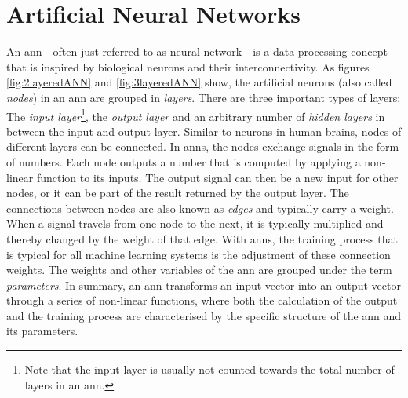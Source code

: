 \documentclass[
			   fontsize=11pt,
               paper=a4,
               bibliography=totoc,
               idxtotoc,
               headsepline,
               footsepline,
               footinclude=false,
               BCOR=12mm,
               DIV=13,
               openany,   %
               ]
               {scrbook}
\begin{document}
\section{Artificial Neural Networks} \label{ssection:ann}

An \acrlong{ann} - often just referred to as neural network - is a data processing concept that is inspired by biological neurons and their interconnectivity. As figures \autoref{fig:2layeredANN} and \autoref{fig:3layeredANN} show, the artificial neurons (also called \textit{nodes}) in an \gls{ann} are grouped in \textit{layers}. There are three important types of layers: The \textit{input layer}\footnote{Note that the input layer is usually not counted towards the total number of layers in an \gls{ann}.}, the \textit{output layer} and an arbitrary number of \textit{hidden layers} in between the input and output layer. Similar to neurons in human brains, nodes of different layers can be connected. In \glspl{ann}, the nodes exchange signals in the form of numbers. Each node outputs a number that is computed by applying a non-linear function to its inputs. The output signal can then be a new input for other nodes, or it can be part of the result returned by the output layer. The connections between nodes are also known as \textit{edges} and typically carry a weight. When a signal travels from one node to the next, it is typically multiplied and thereby changed by the weight of that edge. With \glspl{ann}, the training process that is typical for all machine learning systems is the adjustment of these connection weights. The weights and other variables of the \gls{ann} are grouped under the term \textit{parameters}. In summary, an \gls{ann} transforms an input vector into an output vector through a series of non-linear functions, where both the calculation of the output and the training process are characterised by the specific structure of the \gls{ann} and its parameters.
\end{document}
